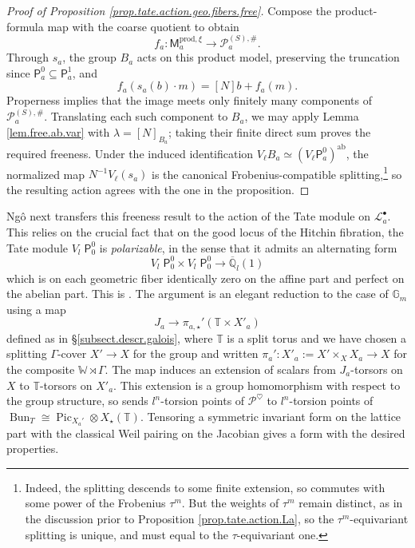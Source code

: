 \documentclass[openany]{amsbook}
\theoremstyle{definition}
\theoremstyle{remark}
\numberwithin{equation}{section}
\newcommand{\Q}{\mathbb{Q}}
\newcommand{\G}{\mathbb{G}}
\newcommand{\T}{\mathbb{T}}
\newcommand{\W}{\mathbb{W}}
\newcommand{\cL}{\mathcal{L}}
\newcommand{\cP}{\mathcal{P}}
\newcommand{\ol}[1]{\overline{#1}}
\renewcommand{\-}{\operatorname{-}}
\newcommand{\Pic}{\operatorname{Pic}}
\newcommand{\on}[1]{\operatorname{#1}}
\newcommand{\bM}{\mathsf{M}}
\newcommand{\bP}{\mathsf{P}}
\newcommand{\Bun}{\on{Bun}}
\newcommand{\Tate}{V_l \;}
\begin{document}
\begin{proof}[Proof of Proposition \ref{prop.tate.action.geo.fibers.free}]
Compose the product-formula map with the coarse quotient to obtain
\[
f_a: \bM_a^{\mathrm{prod},\xi}\longrightarrow
\mathcal P_a^{(S),\#}.
\]
Through $s_a$, the group $B_a$ acts on this product model, preserving the truncation since $\bP_a^0\subseteq\bP_a^1$, and
\[
f_a(s_a(b)\cdot m)=[N]b+f_a(m).
\]
Properness implies that the image meets only finitely many components of $\cP_a^{(S),\#}$. Translating each such component to $B_a$, we may apply Lemma \ref{lem.free.ab.var} with $\lambda=[N]_{B_a}$; taking their finite direct sum proves the required freeness. Under the induced identification $V_\ell B_a\simeq(V_\ell\bP_a^0)^{\mathrm{ab}}$, the normalized map $N^{-1}V_\ell(s_a)$ is the canonical Frobenius-compatible splitting,\footnote{Indeed, the splitting descends to some finite extension, so commutes with some power of the Frobenius $\tau^m$. But the weights of $\tau^m$ remain distinct, as in the discussion prior to Proposition \ref{prop.tate.action.La}, so the $\tau^m$-equivariant splitting is unique, and must equal to the $\tau$-equivariant one.} so the resulting action agrees with the one in the proposition.




\end{proof}




Ng\^{o} next transfers this freeness result to the action of the Tate module on $\cL_a^\bullet$. This relies on the crucial fact that on the good locus of the Hitchin fibration, the Tate module $\Tate \bP_0^{0}$ is \emph{polarizable}, in the sense that it admits an alternating form
$$
    \Tate \bP_0^0 \times \Tate \bP_0^0 \to \ol{\Q}_l(1)
$$
which is on each geometric fiber identically zero on the affine part and perfect on the abelian part. This is \cite[Proposition 4.12.1]{ngofl}. The argument is an elegant reduction to the case of $\G_m$ using a map $$J_a \to \pi_{a, \star}'(\T \times X'_a)$$ defined as in \S \ref{subsect.descr.galois}, where $\T$ is a split torus and we have chosen a splitting $\Gamma$-cover $X' \to X$ for the group and written $\pi_a' : X'_a := X' \times_X X_a \to X$ for the composite $\W \rtimes \Gamma$. The map induces an extension of scalars from $J_a$-torsors on $X$ to $\T$-torsors on $X'_a$. This extension is a group homomorphism with respect to the group structure, so sends $l^n$-torsion points of $\cP^{\heartsuit}$ to $l^n$-torsion points of $\Bun_T \cong \Pic_{X_a'} \otimes X_\star(\T)$. Tensoring a symmetric invariant form on the lattice part with the classical Weil pairing on the Jacobian gives a form with the desired properties. 
\end{document}
